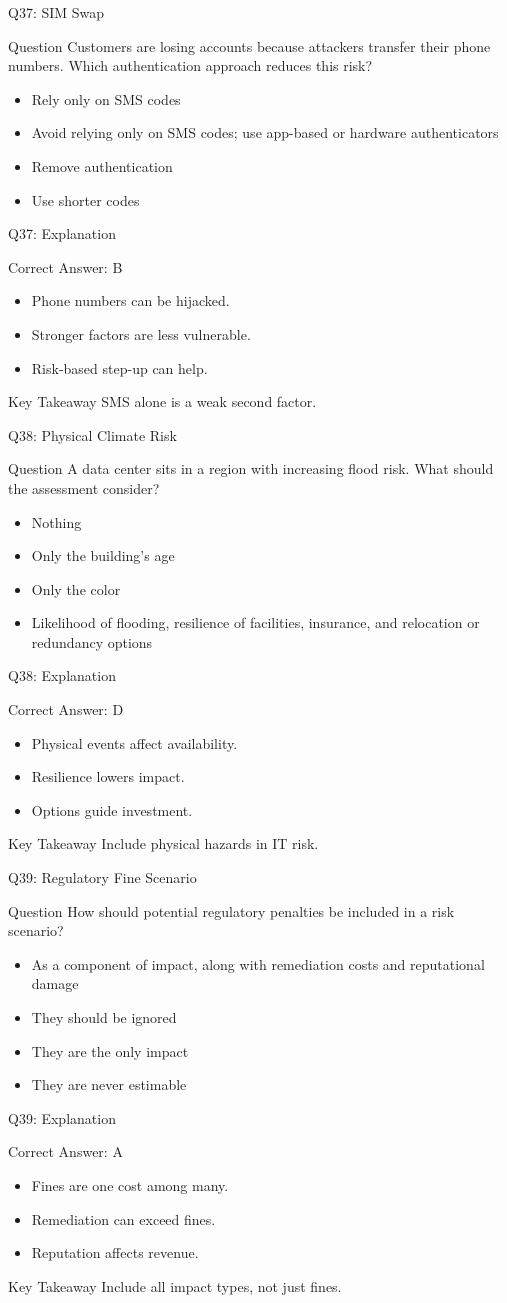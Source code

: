 \documentclass[aspectratio=169]{beamer}
\newcommand{\hq}[7]{%
	\begin{frame}{Q#1: #2}
		\begin{block}{Question}
			#3
		\end{block}
		\begin{itemize}
			#4
		\end{itemize}
	\end{frame}
	\begin{frame}{Q#1: Explanation}
		\begin{block}{Correct Answer: #5}
			\begin{itemize}
				#6
			\end{itemize}
		\end{block}
		\begin{alertblock}{Key Takeaway}
			#7
		\end{alertblock}
	\end{frame}
}
\begin{document}
	\hq{37}{SIM Swap}
	{Customers are losing accounts because attackers transfer their phone numbers. Which authentication approach reduces this risk?}
	{\item[\textbf{(A)}] Rely only on SMS codes
		\item[\textbf{(B)}] Avoid relying only on SMS codes; use app-based or hardware authenticators
		\item[\textbf{(C)}] Remove authentication
		\item[\textbf{(D)}] Use shorter codes}
	{B}
	{\item Phone numbers can be hijacked.
		\item Stronger factors are less vulnerable.
		\item Risk-based step-up can help.}
	{SMS alone is a weak second factor.}

	\hq{38}{Physical Climate Risk}
	{A data center sits in a region with increasing flood risk. What should the assessment consider?}
	{\item[\textbf{(A)}] Nothing
		\item[\textbf{(B)}] Only the building's age
		\item[\textbf{(C)}] Only the color
		\item[\textbf{(D)}] Likelihood of flooding, resilience of facilities, insurance, and relocation or redundancy options}
	{D}
	{\item Physical events affect availability.
		\item Resilience lowers impact.
		\item Options guide investment.}
	{Include physical hazards in IT risk.}

	\hq{39}{Regulatory Fine Scenario}
	{How should potential regulatory penalties be included in a risk scenario?}
	{\item[\textbf{(A)}] As a component of impact, along with remediation costs and reputational damage
		\item[\textbf{(B)}] They should be ignored
		\item[\textbf{(C)}] They are the only impact
		\item[\textbf{(D)}] They are never estimable}
	{A}
	{\item Fines are one cost among many.
		\item Remediation can exceed fines.
		\item Reputation affects revenue.}
	{Include all impact types, not just fines.}
\end{document}
